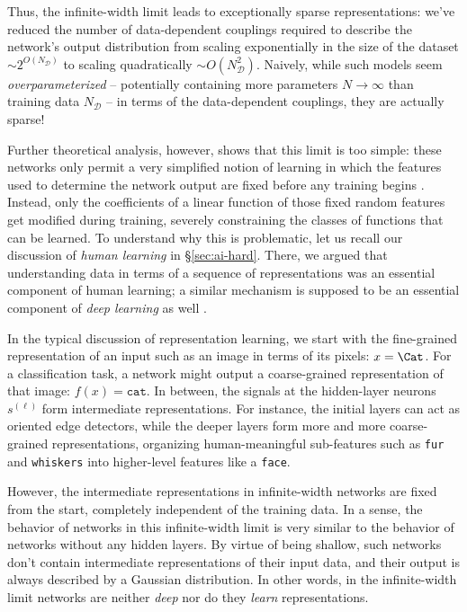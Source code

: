 \documentclass[12pt]{article}
\begin{document}
Thus, the infinite-width limit leads to exceptionally sparse representations: we've reduced the number of data-dependent couplings required to describe the network's output distribution from scaling exponentially in the size of the dataset $\sim2^{O(N_\mathcal{D})}$ to scaling quadratically $\sim O(N_\mathcal{D}^2)$. Naively, while such models seem \emph{overparameterized} -- potentially containing more parameters $N \to \infty$ than training data $N_\mathcal{D}$ -- %
in terms of the data-dependent couplings, they are actually sparse!

Further theoretical analysis, however, shows that this limit is too simple: these networks only permit a very simplified notion of learning in which the features used to determine the network output are fixed before any training begins \cite{jacot2018neural,chizat2018note, li2019towards}. Instead, only the coefficients of a linear function of those fixed random features get modified during training, severely constraining the classes of functions that can be learned.
To understand why this is problematic, let us recall our discussion of \emph{human learning} in \S\ref{sec:ai-hard}. There, we argued that understanding data in terms of a sequence of 
representations was an essential component of human learning;
a similar mechanism is supposed to be an essential component of \emph{deep learning} as well \cite{lecun2015deep,Rob}.






In the typical discussion of representation learning, we start with the fine-grained representation of an input such as an image in terms of its pixels:  $x =\Cat$. For a classification task, a network might output a coarse-grained representation of that image: $f(x) = \texttt{cat}$. In between, the signals at the hidden-layer neurons $s^{(\ell)}$ form intermediate representations. For instance, the initial layers can act as oriented edge detectors, while the deeper layers form more and more coarse-grained representations, organizing human-meaningful sub-features such as \texttt{fur} and \texttt{whiskers} into higher-level features like a \texttt{face}.










However, the intermediate representations in infinite-width networks are fixed from the start, completely independent of the training data. 
In a sense, the behavior of networks in this infinite-width limit is very similar to the behavior of networks without any hidden layers. By virtue of being shallow, such networks don't contain intermediate representations of their input data, and their output is always described by a Gaussian distribution. In other words, in the infinite-width limit networks are neither \emph{deep} nor do they \emph{learn} representations.  
\end{document}
